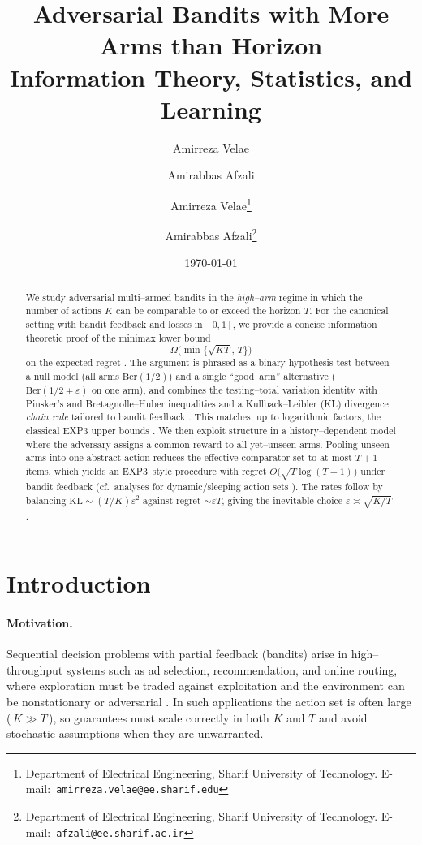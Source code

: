 \documentclass[10pt,twocolumn]{article}
\title{Adversarial Bandits with More Arms than Horizon\\
\large Information Theory, Statistics, and Learning}
\author{Amirreza Velae \and Amirabbas Afzali}
\author{%
  Amirreza Velae\thanks{Department of Electrical Engineering, Sharif University of Technology. E-mail:\ \texttt{amirreza.velae@ee.sharif.edu}}%
  \and
  Amirabbas Afzali\thanks{Department of Electrical Engineering, Sharif University of Technology. E-mail:\ \texttt{afzali@ee.sharif.ac.ir}}%
}
\date{\today}
\theoremstyle{definition}
\theoremstyle{remark}
\begin{document}
\maketitle

\begin{abstract}
  We study adversarial multi–armed bandits in the \emph{high–arm} regime in which the number of actions $K$ can be comparable to or exceed the horizon $T$. For the canonical setting with bandit feedback and losses in $[0,1]$, we provide a concise information–theoretic proof of the minimax lower bound
  \[
    \Omega\!\big(\min\{\sqrt{KT},\,T\}\big)
  \]
  on the expected regret \citep{Auer2002Nonstochastic,BubeckCesaBianchi2012,LS20}. The argument is phrased as a binary hypothesis test between a null model (all arms $\mathrm{Ber}(1/2)$) and a single “good–arm” alternative ($\mathrm{Ber}(1/2+\varepsilon)$ on one arm), and combines the testing–total variation identity \citep{Tsybakov2009} with Pinsker’s and Bretagnolle–Huber inequalities \citep{CoverThomas2006,BretagnolleHuber1979} and a Kullback–Leibler (KL) divergence \emph{chain rule} tailored to bandit feedback \citep{Auer2002Nonstochastic,LS20,BubeckCesaBianchi2012}. This matches, up to logarithmic factors, the classical EXP3 upper bounds \citep{Auer2002Nonstochastic,BubeckCesaBianchi2012}. We then exploit structure in a history–dependent model where the adversary assigns a common reward to all yet–unseen arms. Pooling unseen arms into one abstract action reduces the effective comparator set to at most $T{+}1$ items, which yields an EXP3–style procedure with regret $O\!\big(\sqrt{T\log(T{+}1)}\big)$ under bandit feedback (cf.\ analyses for dynamic/sleeping action sets \citep{Kleinberg2010Sleeping}). The rates follow by balancing $\mathrm{KL}\sim (T/K)\varepsilon^2$ against regret $\sim \varepsilon T$, giving the inevitable choice $\varepsilon\asymp\sqrt{K/T}$ \citep{LS20}.
\end{abstract}

\section{Introduction}
\label{sec:intro}

\paragraph{Motivation.}
Sequential decision problems with partial feedback (bandits) arise in high–throughput systems such as ad selection, recommendation, and online routing, where exploration must be traded against exploitation and the environment can be nonstationary or adversarial \citep{BubeckCesaBianchi2012,LS20}. In such applications the action set is often large (\,$K\gg T$\,), so guarantees must scale correctly in both $K$ and $T$ and avoid stochastic assumptions when they are unwarranted.
\end{document}
